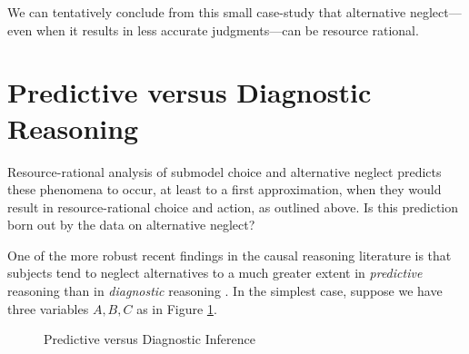 \documentclass[10pt,letterpaper]{article}
\begin{document}
We can tentatively conclude from this small case-study that alternative neglect---even when it results in less accurate judgments---can be resource rational. 

\section{Predictive versus Diagnostic Reasoning}

Resource-rational analysis of submodel choice and alternative neglect predicts these phenomena to occur, at least to a first approximation, when they would result in resource-rational choice and action, as outlined above. Is this prediction born out by the data on alternative neglect?

One of the more robust recent findings in the causal reasoning literature is that subjects tend to neglect alternatives to a much greater extent in \emph{predictive} reasoning than in \emph{diagnostic} reasoning \citep{Fernbach2011,Fernbach2013}. In the simplest case, suppose we have three variables $A,B,C$ as in Figure \ref{diagnostic}.
\begin{figure}[h] \begin{center}
\hspace{.7in}
   \end{center}
 \caption{Predictive versus Diagnostic Inference} \label{diagnostic}
\end{figure}
\end{document}
